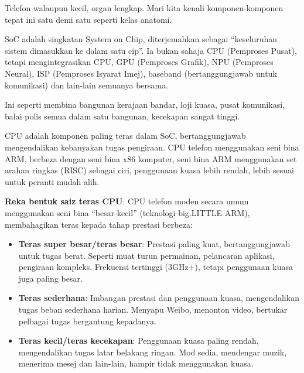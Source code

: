 


Telefon walaupun kecil, organ lengkap. Mari kita kenali komponen-komponen tepat ini satu demi satu seperti kelas anatomi.


SoC adalah singkatan System on Chip, diterjemahkan sebagai “keseluruhan sistem dimasukkan ke dalam satu cip”. Ia bukan sahaja CPU (Pemproses Pusat), tetapi mengintegrasikan CPU, GPU (Pemproses Grafik), NPU (Pemproses Neural), ISP (Pemproses Isyarat Imej), baseband (bertanggungjawab untuk komunikasi) dan lain-lain semuanya bersama.

Ini seperti membina bangunan kerajaan bandar, loji kuasa, pusat komunikasi, balai polis semua dalam satu bangunan, kecekapan sangat tinggi.


CPU adalah komponen paling teras dalam SoC, bertanggungjawab mengendalikan kebanyakan tugas pengiraan. CPU telefon menggunakan seni bina ARM, berbeza dengan seni bina x86 komputer, seni bina ARM menggunakan set arahan ringkas (RISC) sebagai ciri, penggunaan kuasa lebih rendah, lebih sesuai untuk peranti mudah alih.

\textbf{Reka bentuk saiz teras CPU}: CPU telefon moden secara umum menggunakan seni bina “besar-kecil” (teknologi big.LITTLE ARM), membahagikan teras kepada tahap prestasi berbeza:

\begin{itemize}
  \item \textbf{Teras super besar/teras besar}: Prestasi paling kuat, bertanggungjawab untuk tugas berat. Seperti muat turun permainan, pelancaran aplikasi, pengiraan kompleks. Frekuensi tertinggi (3GHz+), tetapi penggunaan kuasa juga paling besar.
  \item \textbf{Teras sederhana}: Imbangan prestasi dan penggunaan kuasa, mengendalikan tugas beban sederhana harian. Menyapu Weibo, menonton video, bertukar pelbagai tugas bergantung kepadanya.
  \item \textbf{Teras kecil/teras kecekapan}: Penggunaan kuasa paling rendah, mengendalikan tugas latar belakang ringan. Mod sedia, mendengar muzik, menerima mesej dan lain-lain, hampir tidak menggunakan kuasa.
\end{itemize}

